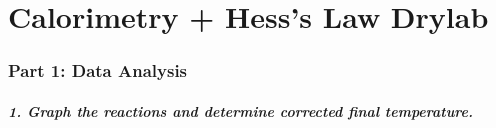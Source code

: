 \documentclass[
]{article}
\author{}
\date{}
\begin{document}
\hypertarget{calorimetry--hesss-law-drylab}{%
\section{Calorimetry + Hess's Law
Drylab}\label{calorimetry--hesss-law-drylab}}

\hypertarget{part-1-data-analysis}{%
\subsubsection{Part 1: Data Analysis}\label{part-1-data-analysis}}

\hypertarget{1-graph-the-reactions-and-determine-corrected-final-temperature}{%
\subparagraph{1. Graph the reactions and determine corrected final
temperature.}\label{1-graph-the-reactions-and-determine-corrected-final-temperature}}
\end{document}
